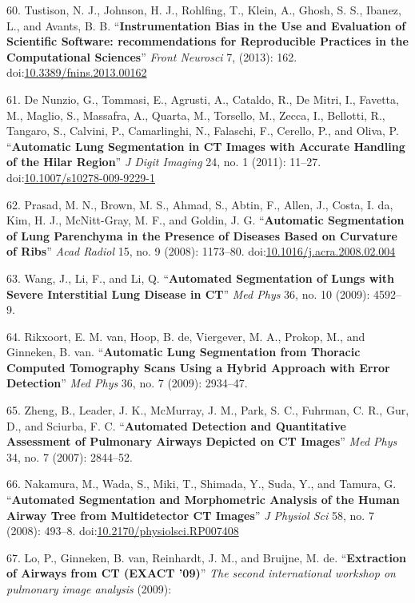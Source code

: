 \documentclass[11pt,]{article}
\begin{document}
60. Tustison, N. J., Johnson, H. J., Rohlfing, T., Klein, A., Ghosh, S.
S., Ibanez, L., and Avants, B. B. ``\textbf{Instrumentation Bias in the
Use and Evaluation of Scientific Software: recommendations for
Reproducible Practices in the Computational Sciences}'' \emph{Front
Neurosci} 7, (2013): 162.
doi:\href{http://dx.doi.org/10.3389/fnins.2013.00162}{10.3389/fnins.2013.00162}

61. De Nunzio, G., Tommasi, E., Agrusti, A., Cataldo, R., De Mitri, I.,
Favetta, M., Maglio, S., Massafra, A., Quarta, M., Torsello, M., Zecca,
I., Bellotti, R., Tangaro, S., Calvini, P., Camarlinghi, N., Falaschi,
F., Cerello, P., and Oliva, P. ``\textbf{Automatic Lung Segmentation in
CT Images with Accurate Handling of the Hilar Region}'' \emph{J Digit
Imaging} 24, no. 1 (2011): 11--27.
doi:\href{http://dx.doi.org/10.1007/s10278-009-9229-1}{10.1007/s10278-009-9229-1}

62. Prasad, M. N., Brown, M. S., Ahmad, S., Abtin, F., Allen, J., Costa,
I. da, Kim, H. J., McNitt-Gray, M. F., and Goldin, J. G.
``\textbf{Automatic Segmentation of Lung Parenchyma in the Presence of
Diseases Based on Curvature of Ribs}'' \emph{Acad Radiol} 15, no. 9
(2008): 1173--80.
doi:\href{http://dx.doi.org/10.1016/j.acra.2008.02.004}{10.1016/j.acra.2008.02.004}

63. Wang, J., Li, F., and Li, Q. ``\textbf{Automated Segmentation of
Lungs with Severe Interstitial Lung Disease in CT}'' \emph{Med Phys} 36,
no. 10 (2009): 4592--9.

64. Rikxoort, E. M. van, Hoop, B. de, Viergever, M. A., Prokop, M., and
Ginneken, B. van. ``\textbf{Automatic Lung Segmentation from Thoracic
Computed Tomography Scans Using a Hybrid Approach with Error
Detection}'' \emph{Med Phys} 36, no. 7 (2009): 2934--47.

65. Zheng, B., Leader, J. K., McMurray, J. M., Park, S. C., Fuhrman, C.
R., Gur, D., and Sciurba, F. C. ``\textbf{Automated Detection and
Quantitative Assessment of Pulmonary Airways Depicted on CT Images}''
\emph{Med Phys} 34, no. 7 (2007): 2844--52.

66. Nakamura, M., Wada, S., Miki, T., Shimada, Y., Suda, Y., and Tamura,
G. ``\textbf{Automated Segmentation and Morphometric Analysis of the
Human Airway Tree from Multidetector CT Images}'' \emph{J Physiol Sci}
58, no. 7 (2008): 493--8.
doi:\href{http://dx.doi.org/10.2170/physiolsci.RP007408}{10.2170/physiolsci.RP007408}

67. Lo, P., Ginneken, B. van, Reinhardt, J. M., and Bruijne, M. de.
``\textbf{Extraction of Airways from CT (EXACT '09)}'' \emph{The second
international workshop on pulmonary image analysis} (2009):
\end{document}
